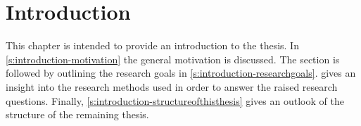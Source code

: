 
\chapter{Introduction}\label{c:introduction}

This chapter is intended to provide an introduction to the thesis.
In \cref{s:introduction-motivation} the general motivation is discussed.
The section is followed by outlining the research goals in \cref{s:introduction-researchgoals}.
 gives an insight into the research methods used in order to answer the raised research questions.
Finally, \cref{s:introduction-structureofthisthesis} gives an outlook of the structure of the remaining thesis.

